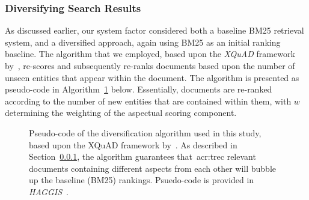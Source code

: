 \subsubsection{Diversifying Search Results}\label{sec:diversity:users:diversifying}
As discussed earlier, our system factor considered both a baseline BM25 retrieval system, and a diversified approach, again using BM25 as an initial ranking baseline. The algorithm that we employed, based upon the \emph{XQuAD} framework by~\cite{santos2010query_reformulations_diversification}, re-scores and subsequently re-ranks documents based upon the number of unseen entities that appear within the document. The algorithm is presented as pseudo-code in Algorithm~\ref{alg:diversifying} below. Essentially, documents are re-ranked according to the number of new entities that are contained within them, with $w$ determining the weighting of the aspectual scoring component.

\renewcommand{\figurename}{Figure/Algorithm}
\begin{figure}[t!]
    \centering
    \caption[Diversification algorithm pseudo-code]{Pseudo-code of the diversification algorithm used in this study, based upon the XQuAD framework by~\cite{santos2010query_reformulations_diversification}. As described in Section~\ref{sec:diversity:users:diversifying}, the algorithm guarantees that~\gls{acr:trec} relevant documents containing different aspects from each other will bubble up the baseline (BM25) rankings. Psuedo-code is provided in \emph{HAGGIS}~\citep{cutts2014haggis}.}
    \label{alg:diversifying}
\end{figure}
\renewcommand{\figurename}{Figure}

